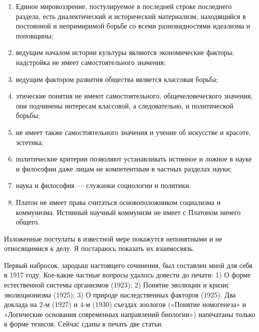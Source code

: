 \begin{enumerate}

  \item Единое мировоззрение, постулируемое в последней строке
        последнего раздела, есть диалектический и исторический
        материализм, находящийся в постоянной и непримиримой борьбе
        со всеми разновидностями идеализма и поповщины;

  \item ведущим началом истории культуры являются экономические
        факторы; надстройка не имеет самостоятельного значения;

  \item ведущим фактором развития общества является классовая
        борьба;

  \item этические понятия не имеют самостоятельного,
        общечеловеческого значения, они подчинены интересам
        классовой, а следовательно, и политической борьбы;

  \item не имеет также самостоятельного значения и учение об
        искусстве и красоте, эстетика;

  \item политические критерии позволяют устанавливать истинное и
        ложное в науке и философии даже лицам не компетентным в
        частных разделах науки;

  \item наука и философия --- служанки социологии и политики.

  \item Платон не имеет права считаться основоположником социализма
        и коммунизма. Истинный научный коммунизм не имеет с Платоном
        ничего общего.

\end{enumerate}

Изложенные  постулаты  в известной  мере  покажутся  непонятными и  не
относящимися к делу. Я постараюсь показать их взаимосвязь.

Первый набросок, зародыш настоящего  сочинения, был составлен мной для
себя в 1917 году. Кое-какие частные вопросы удалось довести до печати:
1) О форме естественной системы организмов (1923); 2) Понятие эволюции
и кризис  эволюционизма (1925);  3) О природе  наследственных факторов
(1925).  Два доклада  на  2-м  (1927) и  4-м  (1930) съездах  зоологов
(«Понятие номогенеза» и  «Логические основания современных направлений
биологии») напечатаны  только в форме  тезисов. Сейчас сданы  в печать
две статьи.

